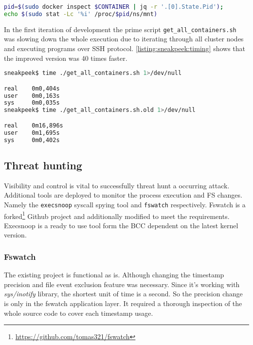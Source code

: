 \begin{lstlisting}[language=bash, style=custom, caption={The main piece of script code for retrieving the muont namespace inode number of the given container. This is executed for each container on a corresponding node.}, label=listing:sneakpeek:mntns]
pid=$(sudo docker inspect $CONTAINER | jq -r '.[0].State.Pid');
echo $(sudo stat -Lc '%i' /proc/$pid/ns/mnt)
\end{lstlisting}

In the first iteration of development the prime script \texttt{get\_all\_containers.sh} was slowing down the whole execution due to iterating through all cluster nodes and executing programs over SSH protocol. \autoref{listing:sneakpeek:timing} shows that the improved version was 40 times faster.

\begin{lstlisting}[language=bash, label=listing:sneakpeek:timing]
sneakpeek$ time ./get_all_containers.sh 1>/dev/null

real    0m0,404s
user    0m0,163s
sys     0m0,035s
sneakpeek$ time ./get_all_containers.sh.old 1>/dev/null

real    0m16,896s
user    0m1,695s
sys     0m0,402s
\end{lstlisting}

\subsection{Threat hunting \label{implementation:mon:hunting}}
Visibility and control is vital to successfully threat hunt a occurring attack. Additional tools are deployed to monitor the process execution and FS changes. Namely the \texttt{execsnoop} syscall spying tool and \texttt{fswatch} respectively. Fswatch is a forked\footnote{\url{https://github.com/tomas321/fswatch}} Github project and additionally modified to meet the requirements. Execsnoop is a ready to use tool form the BCC dependent on the latest kernel version.

\subsubsection*{Fswatch}
The existing project is functional as is. Although changing the timestamp precision and file event exclusion feature was necessary. Since it's working with \textit{sys/inotify} library, the shortest unit of time is a second. So the precision change is only in the fswatch application layer. It required a thorough inspection of the whole source code to cover each timestamp usage.

